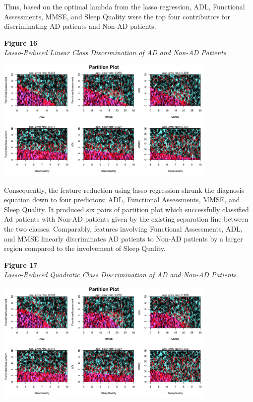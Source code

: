 \documentclass[12pt]{article}
\begin{document}
Thus, based on the optimal lambda from the lasso regression, ADL, Functional Assessments, MMSE, and Sleep Quality were the top four contributors for discriminating AD patients and Non-AD patients. 

\noindent
\textbf{Figure 16} \\
\textit{Lasso-Reduced Linear Class Discrimination of AD and Non-AD Patients}
\begin{center}
    \includegraphics[width = 0.8\textwidth]{Lasso_Reduced_LDA.png}
\end{center}

Consequently, the feature reduction using lasso regression shrunk the diagnosis equation down to four predictors: ADL, Functional Assessments, MMSE, and Sleep Quality. It produced six pairs of partition plot which successfully classified Ad patients with Non-AD patients given by the existing
separation line between the two classes. Comparably, features involving Functional Assessments, ADL, and MMSE linearly discriminates AD patients to Non-AD patients by a larger region compared to the involvement of Sleep Quality. 

\newpage
\noindent
\textbf{Figure 17} \\
\textit{Lasso-Reduced Quadratic Class Discrimination of AD and Non-AD Patients}
\begin{center}
    \includegraphics[width = 0.8\textwidth]{Partimat_QDA_Lasso.png}
\end{center}
\end{document}
